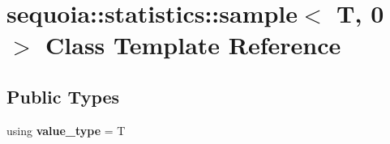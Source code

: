\hypertarget{classsequoia_1_1statistics_1_1sample_3_01_t_00_010_01_4}{}\section{sequoia\+::statistics\+::sample$<$ T, 0 $>$ Class Template Reference}
\label{classsequoia_1_1statistics_1_1sample_3_01_t_00_010_01_4}
\subsection*{Public Types}
\begin{DoxyCompactItemize}
\item 
\mbox{\label{classsequoia_1_1statistics_1_1sample_3_01_t_00_010_01_4_a29610a9af0bc65bab1f4bd7221ecfb88}} 
using {\bfseries value\+\_\+type} = T
\end{DoxyCompactItemize}
